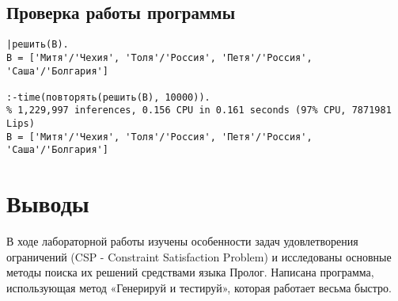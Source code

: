 \documentclass[a4paper,14pt]{extarticle}
\begin{document}
\subsection{Проверка работы программы}
\begin{lstlisting}
|решить(В).
В = ['Митя'/'Чехия', 'Толя'/'Россия', 'Петя'/'Россия', 'Саша'/'Болгария']

:-time(повторять(решить(В), 10000)).
% 1,229,997 inferences, 0.156 CPU in 0.161 seconds (97% CPU, 7871981 Lips)
В = ['Митя'/'Чехия', 'Толя'/'Россия', 'Петя'/'Россия', 'Саша'/'Болгария']
\end{lstlisting}

\section*{Выводы}
В ходе лабораторной работы изучены особенности задач удовлетворения ограничений
(CSP - Constraint Satisfaction Problem) и исследованы основные методы поиска их
решений средствами языка Пролог. Написана программа, использующая метод
«Генерируй и тестируй», которая работает весьма быстро.
\end{document}
